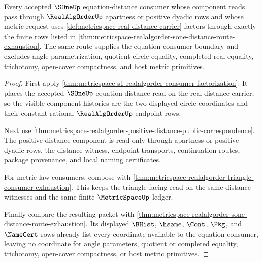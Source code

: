 \begin{theorem}
\label{thm:metric-realalgorder-sone-equation-distance-factorization}
Every accepted $\SOneUp$ equation-distance consumer whose component reads pass
through $\RealAlgOrderUp$ apartness or positive dyadic rows and whose metric
request uses \autoref{def:metricspace-real-distance-carrier} factors through
exactly the finite rows listed in
\autoref{thm:metricspace-realalgorder-sone-distance-route-exhaustion}. The same
route supplies the equation-consumer boundary and excludes angle
parametrization, quotient-circle equality, completed-real equality, trichotomy,
open-cover compactness, and host metric primitives.
\end{theorem}
\begin{proof}
First apply \autoref{thm:metricspace-s1-realalgorder-consumer-factorization}.
It places the accepted $\SOneUp$ equation-distance read on the real-distance
carrier, so the visible component histories are the two displayed circle
coordinates and their constant-rational $\RealAlgOrderUp$ endpoint rows.

Next use
\autoref{thm:metricspace-realalgorder-positive-distance-public-correspondence}.
The positive-distance component is read only through apartness or positive
dyadic rows, the distance witness, endpoint transports, continuation routes,
package provenance, and local naming certificates.

For metric-law consumers, compose with
\autoref{thm:metricspace-realalgorder-triangle-consumer-exhaustion}. This keeps
the triangle-facing read on the same distance witnesses and the same finite
$\MetricSpaceUp$ ledger.

Finally compare the resulting packet with
\autoref{thm:metricspace-realalgorder-sone-distance-route-exhaustion}. Its
displayed $\BHist$, $\hsame$, $\Cont$, $\Pkg$, and $\NameCert$ rows already
list every coordinate available to the equation consumer, leaving no coordinate
for angle parameters, quotient or completed equality, trichotomy, open-cover
compactness, or host metric primitives.
\end{proof}

